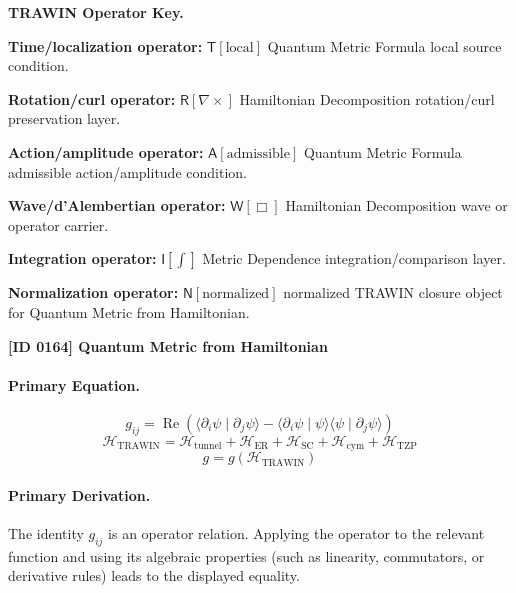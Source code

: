 \par\vspace{0.45\baselineskip}
\noindent\begin{minipage}[t]{\linewidth}
\begingroup
\small
\raggedright
\textbf{TRAWIN Operator Key.}\par
\noindent\textbf{Time/localization operator:} $\mathsf{T}\!\left[\mathrm{local}\right]$ Quantum Metric Formula local source condition.\par
\noindent\textbf{Rotation/curl operator:} $\mathsf{R}\!\left[\nabla\times\right]$ Hamiltonian Decomposition rotation/curl preservation layer.\par
\noindent\textbf{Action/amplitude operator:} $\mathsf{A}\!\left[\mathrm{admissible}\right]$ Quantum Metric Formula admissible action/amplitude condition.\par
\noindent\textbf{Wave/d'Alembertian operator:} $\mathsf{W}\!\left[\Box\right]$ Hamiltonian Decomposition wave or operator carrier.\par
\noindent\textbf{Integration operator:} $\mathsf{I}\!\left[\int\right]$ Metric Dependence integration/comparison layer.\par
\noindent\textbf{Normalization operator:} $\mathsf{N}\!\left[\mathrm{normalized}\right]$ normalized TRAWIN closure object for Quantum Metric from Hamiltonian.\par
\endgroup
\end{minipage}

\clearpage
\noindent\textbf{[ID 0164] Quantum Metric from Hamiltonian}\par
\vspace{0.35em}
\paragraph{Primary Equation.}
\[
g_{ij}
=
\operatorname{Re}\!\left(
\langle \partial_i\psi \mid \partial_j\psi\rangle
-\langle \partial_i\psi \mid \psi\rangle
\langle \psi \mid \partial_j\psi\rangle
\right)
\]
\[
\mathcal{H}_{\mathrm{TRAWIN}}
=
\mathcal{H}_{\mathrm{tunnel}}+\mathcal{H}_{\mathrm{ER}}+\mathcal{H}_{\mathrm{SC}}+\mathcal{H}_{\mathrm{cym}}+\mathcal{H}_{\mathrm{TZP}}
\]
\[
g=g(\mathcal{H}_{\mathrm{TRAWIN}})
\]

\paragraph{Primary Derivation.}
The identity \( g_{ij} \) is an operator relation. Applying the operator to the relevant function and using its algebraic properties (such as linearity, commutators, or derivative rules) leads to the displayed equality.
